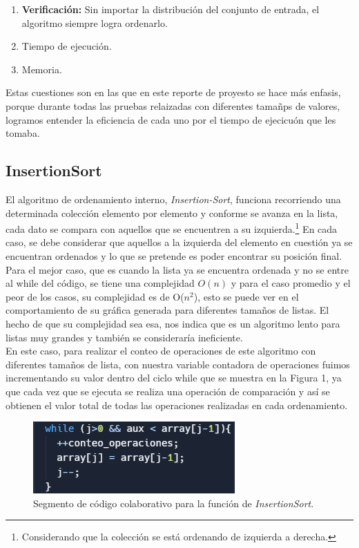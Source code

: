 \documentclass[a4paper,12pt]{article}
\begin{document}
\begin{enumerate}
    \item \textbf{Verificación:} Sin importar la distribución del conjunto de entrada, el algoritmo siempre logra ordenarlo.
    \item Tiempo de ejecución.
    \item Memoria.
\end{enumerate}

Estas cuestiones son en las que en este reporte de proyesto se hace más enfasis, porque durante todas las pruebas relaizadas con diferentes tamañps de valores, logramos entender la eficiencia de cada uno por el tiempo de ejecicuón que les tomaba.

\subsection{InsertionSort}

El algoritmo de ordenamiento interno, \textit{Insertion-Sort}, funciona recorriendo una determinada colección elemento por elemento y conforme se avanza en la lista, cada dato se compara con aquellos que se encuentren a su izquierda.\footnote{Considerando que la colección se está ordenando de izquierda a derecha.} 
En cada caso, se debe considerar que aquellos a la izquierda del elemento en cuestión ya se encuentran ordenados y lo que se pretende es poder encontrar su posición final.\\

Para el mejor caso, que es cuando la lista ya se encuentra ordenada y no se entre al while del código, se tiene una complejidad $O(n)$ y para el caso promedio y el peor de los casos, su complejidad es de O($n^2$), esto se puede ver en el comportamiento de su gráfica generada para diferentes tamaños de listas. El hecho de que su complejidad sea esa, nos indica que es un algoritmo lento para listas muy grandes y también se consideraría ineficiente.\\

En este caso, para realizar el conteo de operaciones de este algoritmo con diferentes tamaños de lista, con nuestra variable contadora de operaciones fuimos incrementando su valor dentro del ciclo while que se muestra en la Figura 1, ya que cada vez que se ejecuta se realiza una operación de comparación y así se obtienen el valor total de todas las operaciones realizadas en cada ordenamiento.

\begin{figure}[h]
    \centering
    \includegraphics[width=0.8\linewidth]{media/insertionSort.png}
    \caption{Segmento de código colaborativo para la función de \textit{InsertionSort}.}
    \label{fig:insertion}
\end{figure}
\end{document}
